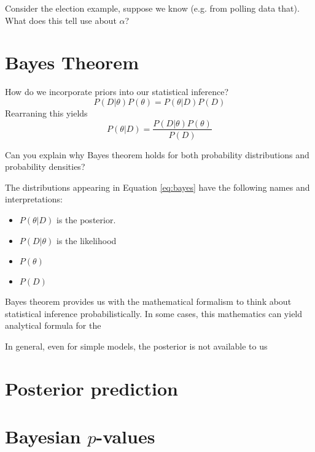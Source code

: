 \begin{exercise} Consider the election example, suppose we know (e.g. from polling data that). What does this tell use about $\alpha$? 
\end{exercise}

\section{Bayes Theorem}
How do we incorporate priors into our statistical inference? 
\begin{equation}
P(D|\theta)P(\theta) = P(\theta|D)P(D)
\end{equation}
Rearraning this yields 
\begin{equation}\label{eq:bayes}
P(\theta|D) = \frac{P(D|\theta)P(\theta)}{P(D)}
\end{equation}

\begin{exercise} Can you explain why Bayes theorem holds for both probability distributions and probability densities? 
\end{exercise}
The distributions appearing in Equation \eqref{eq:bayes} have the following names and interpretations: 
\begin{itemize}
\item $P(\theta|D)$ is the posterior.
\item $P(D|\theta)$ is the likelihood 
\item $P(\theta)$
\item $P(D)$
\end{itemize}
Bayes theorem provides us with the mathematical formalism to think about statistical inference probabilistically. In some cases, this mathematics can yield analytical formula for the 

\begin{exercise} 
\end{exercise}

In general, even for simple models, the posterior is not available to us 

\section{Posterior prediction}

\section{Bayesian $p$-values}



